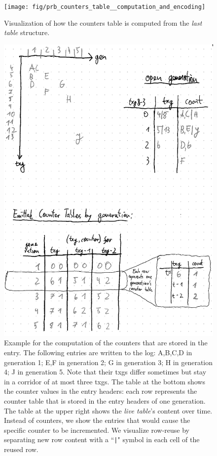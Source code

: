 \documentclass[12pt,a4paper,twoside]{book}
\begin{document}
\begin{figure}[H]
    \centering
    \texttt{[image: fig/prb\_counters\_table\_\_computation\_and\_encoding]}
    \caption{
        Visualization of how the counters table is computed from the \textit{last table} structure.
    }
    \label{fig:prb_counters_table__computation}
\end{figure}

\begin{figure}[H]
    \centering
    \includegraphics{fig/prb_counters_table__example}
    \caption{
        Example for the computation of the counters that are stored in the entry.
        The following entries are written to the log:
        A,B,C,D in generation 1; E,F in generation 2; G in generation 3; H in generation 4; J in generation 5.
        Note that their txgs differ sometimes but stay in a corridor of at most three txgs.
        The table at the bottom shows the counter values in the entry headers:
        each row represents the counter table that is stored in the entry headers of one generation.
        The table at the upper right shows the \textit{live table}'s content over time.
        Instead of counters, we show the entries that would cause the specific counter to be incremented.
        We visualize row-reuse by separating new row content with a ``\lstinline{|}" symbol in each cell of the reused row.
    }
    \label{fig:prb_counters_table__example}
\end{figure}
\end{document}
